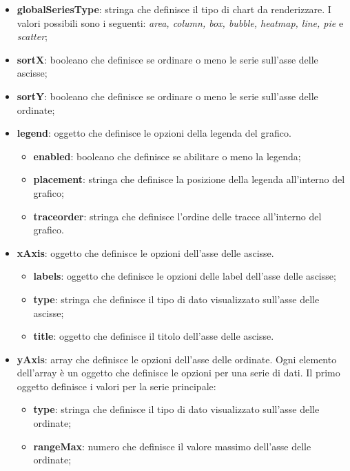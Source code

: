 \begin{itemize}
      \item \textbf{globalSeriesType}: stringa che definisce il tipo di chart da renderizzare. I valori possibili sono i seguenti:
            \textit{area, column, box, bubble, heatmap, line, pie} e \textit{scatter};
      \item \textbf{sortX}: booleano che definisce se ordinare o meno le serie sull'asse delle ascisse;
      \item \textbf{sortY}: booleano che definisce se ordinare o meno le serie sull'asse delle ordinate;
      \item \textbf{legend}: oggetto che definisce le opzioni della legenda del grafico.
            \begin{itemize}
                  \item \textbf{enabled}: booleano che definisce se abilitare o meno la legenda;
                  \item \textbf{placement}: stringa che definisce la posizione della legenda all'interno del grafico;
                  \item \textbf{traceorder}: stringa che definisce l'ordine delle tracce all'interno del grafico.
            \end{itemize}
      \item \textbf{xAxis}: oggetto che definisce le opzioni dell'asse delle ascisse.
            \begin{itemize}
                  \item \textbf{labels}: oggetto che definisce le opzioni delle label dell'asse delle ascisse;
                  \item \textbf{type}: stringa che definisce il tipo di dato visualizzato sull'asse delle ascisse;
                  \item \textbf{title}: oggetto che definisce il titolo dell'asse delle ascisse.
            \end{itemize}
      \item \textbf{yAxis}: array che definisce le opzioni dell'asse delle ordinate. Ogni elemento dell'array è un oggetto che definisce le opzioni per una serie di dati. \newline
            Il primo oggetto definisce i valori per la serie principale:
            \begin{itemize}
                  \item \textbf{type}: stringa che definisce il tipo di dato visualizzato sull'asse delle ordinate;
                  \item \textbf{rangeMax}: numero che definisce il valore massimo dell'asse delle ordinate;

\end{itemize}
\end{itemize}
